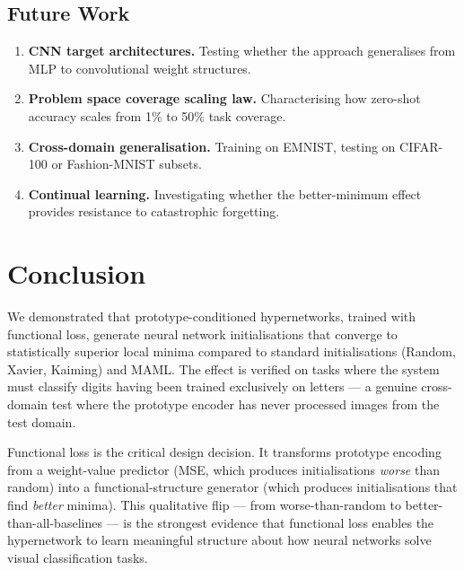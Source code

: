 \documentclass[11pt,a4paper]{article}
\begin{document}
\subsection{Future Work}

\begin{enumerate}[noitemsep]
    \item \textbf{CNN target architectures.} Testing whether the approach generalises from MLP to convolutional weight structures.
    \item \textbf{Problem space coverage scaling law.} Characterising how zero-shot accuracy scales from 1\% to 50\% task coverage.
    \item \textbf{Cross-domain generalisation.} Training on EMNIST, testing on CIFAR-100 or Fashion-MNIST subsets.
    \item \textbf{Continual learning.} Investigating whether the better-minimum effect provides resistance to catastrophic forgetting.
\end{enumerate}

\section{Conclusion}
\label{sec:conclusion}

We demonstrated that prototype-conditioned hypernetworks, trained with functional loss, generate neural network initialisations that converge to statistically superior local minima compared to standard initialisations (Random, Xavier, Kaiming) and MAML. The effect is verified on tasks where the system must classify digits having been trained exclusively on letters --- a genuine cross-domain test where the prototype encoder has never processed images from the test domain.

Functional loss is the critical design decision. It transforms prototype encoding from a weight-value predictor (MSE, which produces initialisations \emph{worse} than random) into a functional-structure generator (which produces initialisations that find \emph{better} minima). This qualitative flip --- from worse-than-random to better-than-all-baselines --- is the strongest evidence that functional loss enables the hypernetwork to learn meaningful structure about how neural networks solve visual classification tasks.
\end{document}
